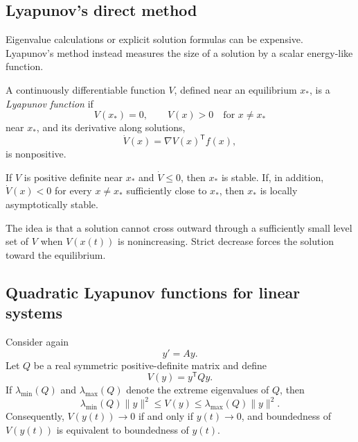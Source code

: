 \subsection{Lyapunov's direct method}

Eigenvalue calculations or explicit solution formulas can be
expensive. Lyapunov's method instead measures the size of a solution by
a scalar energy-like function.

\begin{definition}
  A continuously differentiable function \(V\), defined near an
  equilibrium \(x_*\), is a \emph{Lyapunov function} if
  \[
    V(x_*)=0,
    \qquad
    V(x)>0\quad\text{for }x\neq x_*
  \]
  near \(x_*\), and its derivative along solutions,
  \begin{equation}\label{eq:lyapunov-orbital-derivative-sep-14}
    \dot V(x)
    =\nabla V(x)^{\mathsf T}f(x),
  \end{equation}
  is nonpositive.
\end{definition}

\begin{theorem}
  If \(V\) is positive definite near \(x_*\) and
  \(\dot V\leq0\), then \(x_*\) is stable. If, in addition,
  \(\dot V(x)<0\) for every \(x\neq x_*\) sufficiently close to
  \(x_*\), then \(x_*\) is locally asymptotically stable.
\end{theorem}

The idea is that a solution cannot cross outward through a sufficiently
small level set of \(V\) when \(V(x(t))\) is nonincreasing. Strict
decrease forces the solution toward the equilibrium.

\subsection{Quadratic Lyapunov functions for linear systems}

Consider again
\begin{equation}\label{eq:linear-system-sep-14}
  y'=Ay.
\end{equation}
Let \(Q\) be a real symmetric positive-definite matrix and define
\begin{equation}\label{eq:quadratic-lyapunov-sep-14}
  V(y)=y^{\mathsf T}Qy.
\end{equation}
If \(\lambda_{\min}(Q)\) and \(\lambda_{\max}(Q)\) denote the extreme
eigenvalues of \(Q\), then
\begin{equation}\label{eq:quadratic-norm-equivalence-sep-14}
  \lambda_{\min}(Q)\lVert y\rVert^2
  \leq V(y)
  \leq \lambda_{\max}(Q)\lVert y\rVert^2.
\end{equation}
Consequently, \(V(y(t))\to0\) if and only if \(y(t)\to0\), and
boundedness of \(V(y(t))\) is equivalent to boundedness of \(y(t)\).

